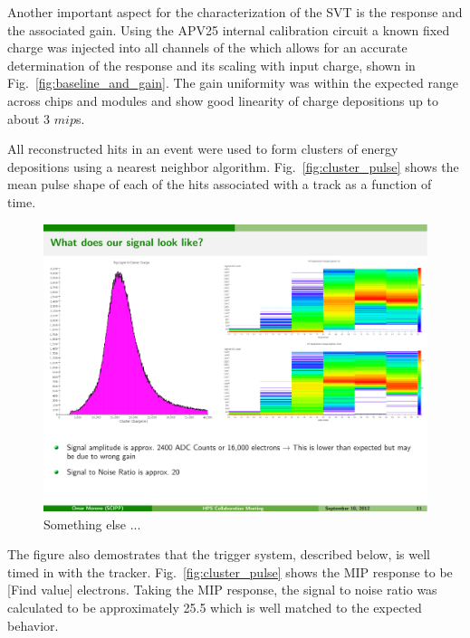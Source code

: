 Another important aspect for the characterization of the SVT is the response and the associated 
gain. Using the APV25 internal calibration circuit a known fixed charge was injected into all 
channels of the which allows for an accurate determination of the response and its 
scaling with input charge, shown in Fig.~\ref{fig:baseline_and_gain}. The gain uniformity was 
within the expected range across chips and modules and show good linearity of charge 
depositions up to about 3 $mip$s. 

All reconstructed hits in an event were used to form clusters of energy 
depositions using a nearest neighbor algorithm. Fig.~\ref{fig:cluster_pulse}
shows the mean pulse shape of each of the hits associated with a track as a 
function of time.  
\begin{figure}[h]
	\includegraphics[width=\textwidth]{test2012/svtperformance/pulseshape_and_landau}
    \caption{Something else ...}
	\label{fig:pulseshape}
\end{figure}
The figure also demostrates that  the trigger system, described below, is well 
timed in with the tracker. 
Fig.~\ref{fig:cluster_pulse} shows the MIP response to be [Find value] electrons.
Taking the MIP response, the signal to noise ratio was calculated to be 
approximately 25.5 which is well matched to the expected behavior.


 
